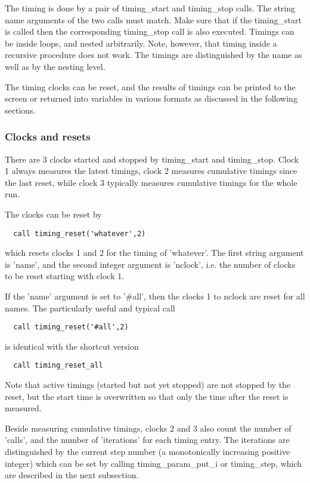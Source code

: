 The timing is done by a pair of timing\_start and timing\_stop calls.
The string name arguments of the two calls must match. 
Make sure that if the timing\_start is called then the corresponding
timing\_stop call is also executed. 
Timings can be inside loops, and nested arbitrarily. 
Note, however, that timing inside a recursive procedure does not work.
The timings are distinguished by the name as well as by the nesting level.

The timing clocks can be reset, and the results of timings can be printed 
to the screen or returned into variables in various formats as discussed 
in the following sections. 

\subsubsection{Clocks and resets}

There are 3 clocks started and stopped by timing\_start
and timing\_stop. Clock 1 always measures the latest timings,
clock 2 measures cumulative timings since the last reset,
while clock 3 typically measures cumulative timings for the whole run.

The clocks can be reset by
\begin{verbatim}
  call timing_reset('whatever',2)
\end{verbatim}
which resets clocks 1 and 2 for the timing of 'whatever'. 
The first string argument is 'name', and the second integer
argument is 'nclock', i.e. the number of clocks to be reset
starting with clock 1.

If the 'name' argument is set to '\#all', 
then the clocks 1 to nclock are reset for all names.
The particularly useful and typical call 
\begin{verbatim}
  call timing_reset('#all',2)
\end{verbatim}
is identical with the shortcut version
\begin{verbatim}
  call timing_reset_all
\end{verbatim}
Note that active timings (started but not yet stopped) are not stopped 
by the reset, but the start time is overwritten
so that only the time after the reset is measured.

Beside measuring cumulative timings, clocks 2 and 3 also count the number 
of 'calls', and the number of 'iterations' for each timing entry. 
The iterations are distinguished by the current step number 
(a monotonically increasing positive integer) which can be set by calling
timing\_param\_put\_i or timing\_step, which are
described in the next subsection.

